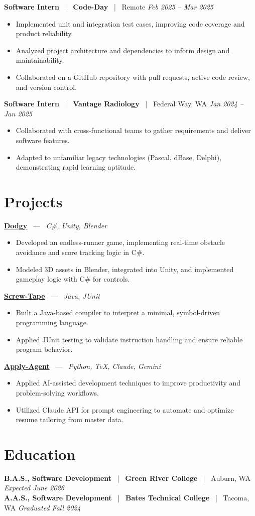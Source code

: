 \documentclass[10pt, letterpaper]{article}
\newcommand{\jobhead}[4]{%
  \vspace{5pt}%
  {\bfseries\color{dark}#1}%
  ~{\color{light}|}~%
  {\bfseries\color{navy}#2}%
  ~{\color{light}|}~%
  {\color{light}#3}%
  \hfill{\color{light}\small\textit{#4}}\\[-2pt]%
}
\newcommand{\projhead}[3]{%
  \vspace{5pt}%
  {\bfseries\color{dark}\href{#2}{#1}}%
  ~{\color{light}---}~%
  {\color{light}\small\textit{#3}}\\[-2pt]%
}
\begin{document}
\jobhead{Software Intern}{Code-Day}{Remote}{Feb 2025 – Mar 2025}
\begin{itemize}
  \item Implemented unit and integration test cases, improving code coverage and product reliability.
  \item Analyzed project architecture and dependencies to inform design and maintainability.
  \item Collaborated on a GitHub repository with pull requests, active code review, and version control.
\end{itemize}

\jobhead{Software Intern}{Vantage Radiology}{Federal Way, WA}{Jan 2024 – Jan 2025}
\begin{itemize}
  \item Collaborated with cross-functional teams to gather requirements and deliver software features.
  \item Adapted to unfamiliar legacy technologies (Pascal, dBase, Delphi), demonstrating rapid learning aptitude.
\end{itemize}

\section{Projects}

\projhead{Dodgy}{https://timyd.itch.io/dodgy}{C\#, Unity, Blender}
\begin{itemize}
  \item Developed an endless-runner game, implementing real-time obstacle avoidance and score tracking logic in C\#.
  \item Modeled 3D assets in Blender, integrated into Unity, and implemented gameplay logic with C\# for controls.
\end{itemize}

\projhead{Screw-Tape}{https://github.com/timmyd4/screwtape}{Java, JUnit}
\begin{itemize}
  \item Built a Java-based compiler to interpret a minimal, symbol-driven programming language.
  \item Applied JUnit testing to validate instruction handling and ensure reliable program behavior.
\end{itemize}

\projhead{Apply-Agent}{https://github.com/timmyd4/apply-agent}{Python, TeX, Claude, Gemini}
\begin{itemize}
  \item Applied AI-assisted development techniques to improve productivity and problem-solving workflows.
  \item Utilized Claude API for prompt engineering to automate and optimize resume tailoring from master data.
\end{itemize}

\section{Education}

\jobhead{B.A.S., Software Development}{Green River College}{Auburn, WA}{Expected June 2026}
\jobhead{A.A.S., Software Development}{Bates Technical College}{Tacoma, WA}{Graduated Fall 2024}
\end{document}
